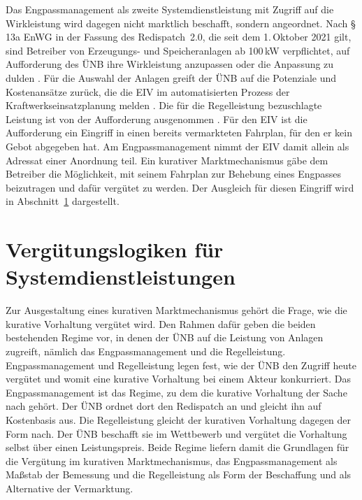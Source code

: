 Das Engpassmanagement als zweite Systemdienstleistung mit Zugriff auf die Wirkleistung wird dagegen nicht marktlich beschafft, sondern angeordnet.
Nach §\,13a \ac{EnWG} in der Fassung des Redispatch~2.0, die seit dem 1.\,Oktober 2021 gilt, sind Betreiber von Erzeugungs- und Speicheranlagen ab 100\,\si{kW} verpflichtet, auf Aufforderung des \ac{ÜNB} ihre Wirkleistung anzupassen oder die Anpassung zu dulden \cite{bundesministerium_der_justiz_energiewirtschaftsgesetz_2025}.
Für die Auswahl der Anlagen greift der \ac{ÜNB} auf die Potenziale und Kostenansätze zurück, die die \ac{EIV} im automatisierten Prozess der Kraftwerkseinsatzplanung melden \cite{bdew_branchenleitfaden_2018}.
Die für die Regelleistung bezuschlagte Leistung ist von der Aufforderung ausgenommen \cite{bundesnetzagentur_anlage1_2024}.
Für den \ac{EIV} ist die Aufforderung ein Eingriff in einen bereits vermarkteten Fahrplan, für den er kein Gebot abgegeben hat.
Am Engpassmanagement nimmt der \ac{EIV} damit allein als Adressat einer Anordnung teil.
Ein kurativer Marktmechanismus gäbe dem Betreiber die Möglichkeit, mit seinem Fahrplan zur Behebung eines Engpasses beizutragen und dafür vergütet zu werden.
Der Ausgleich für diesen Eingriff wird in Abschnitt~\ref{sec:market_limits} dargestellt.

\section{Vergütungslogiken für Systemdienstleistungen}
\label{sec:market_limits}

Zur Ausgestaltung eines kurativen Marktmechanismus gehört die Frage, wie die kurative Vorhaltung vergütet wird.
Den Rahmen dafür geben die beiden bestehenden Regime vor, in denen der \ac{ÜNB} auf die Leistung von Anlagen zugreift, nämlich das Engpassmanagement und die Regelleistung.
Engpassmanagement und Regelleistung legen fest, wie der \ac{ÜNB} den Zugriff heute vergütet und womit eine kurative Vorhaltung bei einem Akteur konkurriert.
Das Engpassmanagement ist das Regime, zu dem die kurative Vorhaltung der Sache nach gehört.
Der \ac{ÜNB} ordnet dort den Redispatch an und gleicht ihn auf Kostenbasis aus.
Die Regelleistung gleicht der kurativen Vorhaltung dagegen der Form nach.
Der \ac{ÜNB} beschafft sie im Wettbewerb und vergütet die Vorhaltung selbst über einen Leistungspreis.
Beide Regime liefern damit die Grundlagen für die Vergütung im kurativen Marktmechanismus, das Engpassmanagement als Maßstab der Bemessung und die Regelleistung als Form der Beschaffung und als Alternative der Vermarktung.

